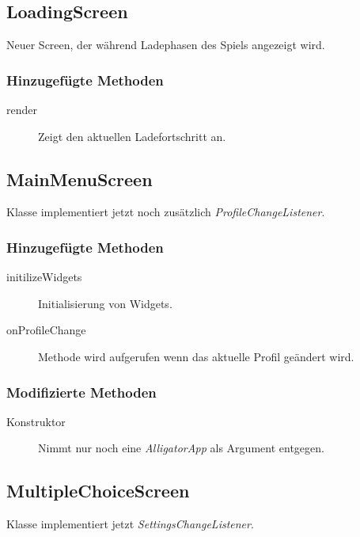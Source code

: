 \subsection{LoadingScreen}
Neuer Screen, der während Ladephasen des Spiels angezeigt wird.

\subsubsection{Hinzugefügte Methoden}
\begin{description}
\item[render]
Zeigt den aktuellen Ladefortschritt an.


\end{description}



\subsection{MainMenuScreen}
Klasse implementiert jetzt noch zusätzlich \emph{ProfileChangeListener}.

\subsubsection{Hinzugefügte Methoden}
\begin{description}
\item[initilizeWidgets]
Initialisierung von Widgets.
\item[onProfileChange]
Methode wird aufgerufen wenn das aktuelle Profil geändert wird.

\end{description}

\subsubsection{Modifizierte Methoden}
\begin{description}
\item[Konstruktor]
Nimmt nur noch eine \emph{AlligatorApp} als Argument entgegen.

\end{description}


\subsection{MultipleChoiceScreen}
Klasse implementiert jetzt \emph{SettingsChangeListener}.

